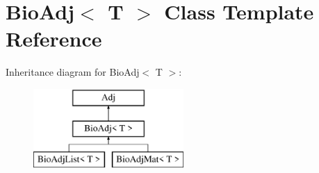\hypertarget{class_bio_adj}{}\section{Bio\+Adj$<$ T $>$ Class Template Reference}
\label{class_bio_adj}
Inheritance diagram for Bio\+Adj$<$ T $>$\+:\begin{figure}[H]
\begin{center}
\leavevmode
\includegraphics[height=3.000000cm]{class_bio_adj}
\end{center}
\end{figure}

